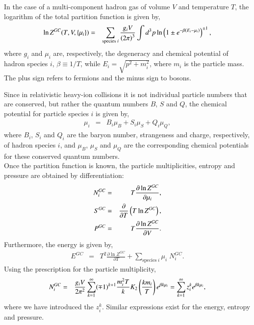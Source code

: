 \documentclass{elsarticle}
\begin{document}
In the case of a multi-component hadron gas of volume $V$ and temperature $T$, the 
logarithm of the total partition 
function is given by,
\begin{eqnarray}
\ln Z^{GC}(T,V,\{\mu_i\}) &=& \sum_{\mathrm{species}\;i}{g_iV\over\left(2\pi\right)^3}\int d^3p\ln\left(1\pm e^{-\beta\left(E_i-\mu_i\right)}\right)^{\pm1},
                          \end{eqnarray}
where $g_i$ and $\mu_i$ are, respectively, the degeneracy and chemical potential 
of hadron species $i$, $\beta\equiv 1/T$, while $E_i=\sqrt{p^2+m_i^2}$, where $m_i$ is the particle 
mass. The plus sign refers to fermions and the minus sign to bosons.

Since in relativistic heavy-ion collisions it is not individual particle numbers 
that are conserved, but rather the quantum numbers $B$, $S$ and $Q$, the chemical 
potential for particle species $i$ is given by,
\begin{eqnarray}
\mu_i &=& B_i\mu_B + S_i\mu_S + Q_i\mu_Q,
\end{eqnarray}
where $B_i$, $S_i$ and $Q_i$ are the baryon number, strangeness and charge, respectively, of hadron species 
$i$, and $\mu_B$, $\mu_S$ and $\mu_Q$ are the corresponding chemical potentials for 
these conserved quantum numbers.\\

Once the partition function is known, the particle 
multiplicities, entropy and pressure are obtained by differentiation: 
\begin{eqnarray}
N_i^{GC} &=& T{\partial\ln Z^{GC}\over\partial\mu_i},\\
S^{GC} &=& {\partial\over\partial T}\left(T\ln Z^{GC}\right),\\ 
P^{GC} &=& T{\partial\ln Z^{GC}\over\partial V}.
\end{eqnarray}
Furthermore, the energy is given by,
\begin{eqnarray}
E^{GC} &=& T^2\frac{\partial \ln Z^{GC}}{\partial T} + \sum_{\mathrm{species}\;i}\mu_i\;N_i^{GC}.
\end{eqnarray}
Using the prescription for the particle multiplicity, 
\begin{eqnarray}
N_i^{GC} &=& {g_iV \over 2\pi^2}\sum_{k=1}^{\infty}(\mp
  1)^{k+1}{m_i^2 T\over k}
  K_2\left(km_i\over T\right)e^{\beta k\mu_i}=\sum_{k=1}^{\infty}z_i^k e^{\beta k \mu_i},\label{density}
\end{eqnarray}
where we have introduced the $z_i^k$. Similar expressions exist for the energy, entropy and pressure.\\
\end{document}
